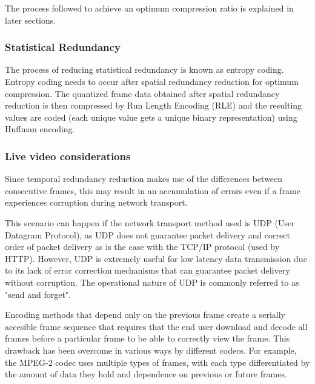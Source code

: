 \documentclass[letterpaper,12pt,titlepage,oneside,final]{report}
\begin{document}
                The process followed to achieve an optimum compression ratio is explained in later sections.

            \subsubsection{Statistical Redundancy}
                The process of reducing statistical redundancy is known as entropy coding. Entropy coding needs to occur after spatial redundancy reduction for optimum compression. The quantized frame data obtained after spatial redundancy reduction is then compressed by Run Length Encoding (RLE) and the resulting values are coded (each unique value gets a unique binary representation) using Huffman encoding. 

            \subsubsection{Live video considerations}
                Since temporal redundancy reduction makes use of the differences between consecutive frames, this may result in an accumulation of errors even if a frame experiences corruption during network transport. 

                This scenario can happen if the network transport method used is UDP (User Datagram Protocol), as UDP does not guarantee packet delivery and correct order of packet delivery as is the case with the TCP/IP protocol (used by HTTP). However, UDP is extremely useful for low latency data transmission due to its lack of error correction mechanisms that can guarantee packet delivery without corruption. The operational nature of UDP is commonly referred to as "send and forget".

                Encoding methods that depend only on the previous frame create a serially accesible frame sequence that requires that the end user download and decode all frames before a particular frame to be able to correctly view the frame. This drawback has been overcome in various ways by different codecs. For example, the MPEG-2 codec uses multiple types of frames, with each type differentiated by the amount of data they hold and dependence on previous or future frames.
\end{document}
